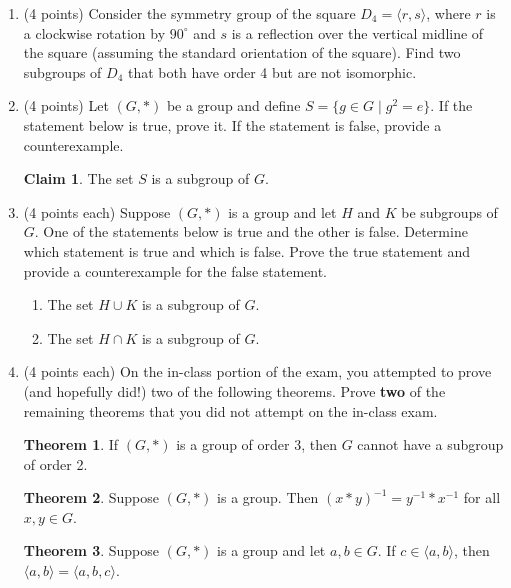 \documentclass[11pt]{article}
\theoremstyle{definition}
\newtheorem{theorem}{Theorem}
\newtheorem*{claim*}{Claim}
\begin{document}
\begin{enumerate}

\item (4 points) Consider the symmetry group of the square $D_4=\langle r,s\rangle$, where $r$ is a clockwise rotation by $90^{\circ}$ and $s$ is a reflection over the vertical midline of the square (assuming the standard orientation of the square).  Find two subgroups of $D_4$ that both have order 4 but are not isomorphic.

\item (4 points) Let $(G,*)$ be a group and define $S=\{g\in G\mid g^2=e\}$.  If the statement below is true, prove it.  If the statement is false, provide a counterexample.

\begin{claim*}
The set $S$ is a subgroup of $G$.
\end{claim*}

\item (4 points each) Suppose $(G,*)$ is a group and let $H$ and $K$ be subgroups of $G$. One of the statements below is true and the other is false. Determine which statement is true and which is false. Prove the true statement and provide a counterexample for the false statement.  

\begin{enumerate}
\item The set $H\cup K$ is a subgroup of $G$.
\item The set $H\cap K$ is a subgroup of $G$.
\end{enumerate}

\item (4 points each) On the in-class portion of the exam, you attempted to prove (and hopefully did!) two of the following theorems.  Prove \textbf{two} of the remaining theorems that you did not attempt on the in-class exam.

\begin{theorem}
If $(G,*)$ is a group of order 3, then $G$ cannot have a subgroup of order 2.
\end{theorem}

\begin{theorem}
Suppose $(G,*)$ is a group.  Then $(x*y)^{-1}=y^{-1}*x^{-1}$ for all $x,y\in G$.
\end{theorem}

\begin{theorem}
Suppose $(G,*)$ is a group and let $a,b\in G$.  If $c\in\langle a,b\rangle$, then $\langle a,b\rangle=\langle a,b,c\rangle$.
\end{theorem}


\end{enumerate}
\end{document}
